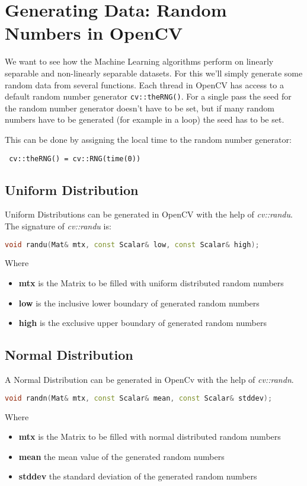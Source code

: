 \section{Generating Data: Random Numbers in OpenCV}
We want to see how the Machine Learning algorithms perform on linearly separable and non-linearly separable datasets. For this we'll simply generate some random data from several functions. Each thread in OpenCV has access to a default random number generator \lstinline|cv::theRNG()|. For a single pass the seed for the random number generator doesn't have to be set, but if many random numbers have to be generated (for example in a loop) the seed has to be set.

This can be done by assigning the local time to the random number generator:

\begin{lstlisting}
 cv::theRNG() = cv::RNG(time(0))
\end{lstlisting}

\subsection{Uniform Distribution}
Uniform Distributions can be generated in OpenCV with the help of \textit{cv::randu}. The signature of \textit{cv::randu} is:
\begin{lstlisting}[language=C++]
void randu(Mat& mtx, const Scalar& low, const Scalar& high);
\end{lstlisting}
Where
\begin{itemize}
 \item \textbf{mtx} is the Matrix to be filled with uniform distributed random numbers
 \item \textbf{low} is the inclusive lower boundary of generated random numbers
 \item \textbf{high} is the exclusive upper boundary of generated random numbers
\end{itemize}

\subsection{Normal Distribution}
A Normal Distribution can be generated in OpenCv with the help of \textit{cv::randn}.
\begin{lstlisting}[language=C++]
void randn(Mat& mtx, const Scalar& mean, const Scalar& stddev);
\end{lstlisting}
Where
\begin{itemize}
 \item \textbf{mtx} is the Matrix to be filled with normal distributed random numbers
 \item \textbf{mean} the mean value of the generated random numbers
 \item \textbf{stddev} the standard deviation of the generated random numbers
\end{itemize}

